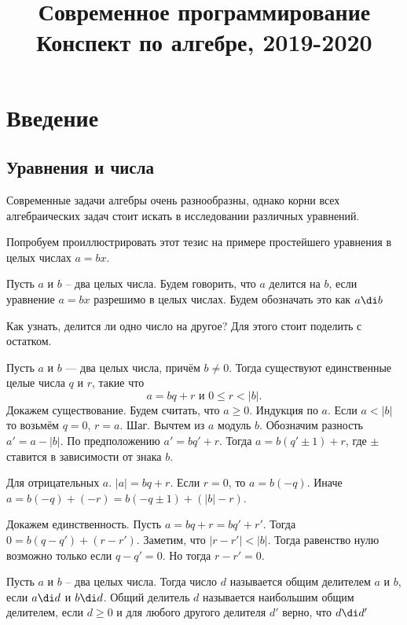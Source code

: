 



\title{Современное программирование \\ 
Конспект по алгебре, 2019-2020}
\date{}




\tableofcontents

\chapter{Введение}




\section{Уравнения и числа}

Современные задачи алгебры очень разнообразны, однако корни всех алгебраических задач стоит искать в исследовании различных уравнений.


Попробуем проиллюстрировать этот тезис на примере простейшего уравнения в целых числах $a=bx$.

\dfn[Делимость] Пусть $a$ и $b$ -- два целых числа. Будем говорить, что $a$ делится на $b$, если уравнение $a=bx$ разрешимо в целых числах. Будем обозначать это как $a\di b$ 
\edfn

Как узнать, делится ли одно число на другое? Для этого стоит поделить с остатком.

 Пусть $a$ и $b$ --- два целых числа, причём $b\neq 0$. Тогда существуют единственные целые
числа $q$ и $r$, такие что
$$a=bq+r \text{ и } 0\leq r< |b|.$$
\ethrm
\proof Докажем существование. Будем считать, что $a\geq 0$. Индукция по $a$. Если $a<|b|$  то возьмём $q=0$, $r=a$. Шаг. Вычтем из $a$ модуль $b$. Обозначим разность $a'=a-|b|$. По предположению $a'=bq'+r$. Тогда $a=b(q'\pm 1)+r$, где $\pm$ ставится в зависимости от знака $b$. 

Для отрицательных $a$. $|a|=bq+r$. Если $r=0$, то $a=b(-q)$.  Иначе $a=b(-q)+(-r)=b(-q\pm 1)+(|b|-r)$.

Докажем единственность. Пусть $a=bq+r=bq'+r'$. Тогда $0=b(q-q')+(r-r')$. Заметим, что $|r-r'|<|b|$. Тогда равенство нулю возможно только если $q-q'=0$. Но тогда $r-r'=0$.
\endproof




 Пусть $a$ и $b$ -- два целых числа. Тогда число $d$ называется общим делителем $a$ и $b$, если $a\di  d $ и $b \di d$.
Общий делитель $d$ называется наибольшим общим делителем, если $d\geq 0$  и для любого другого делителя $d'$ верно, что $d \di d'$
\edfn

